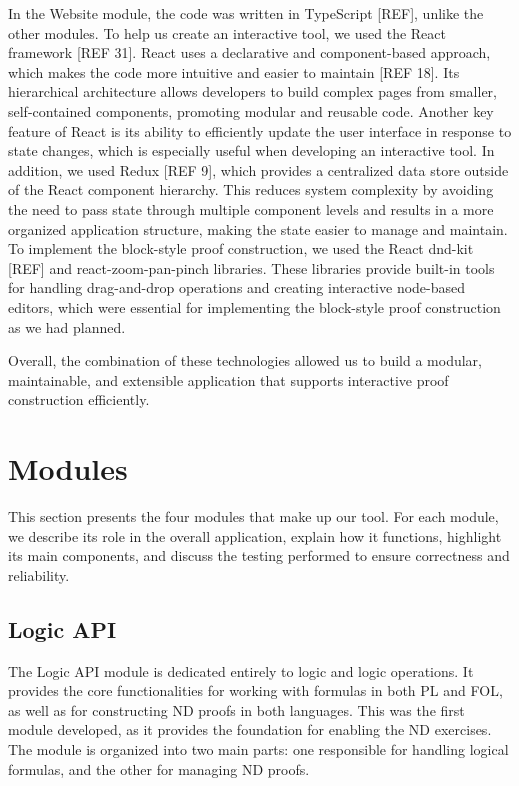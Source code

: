 In the Website module, the code was written in TypeScript [REF], unlike the other modules. To help us create an interactive tool, we used the React framework [REF 31]. React uses a declarative and component-based approach, which makes the code more intuitive and easier to maintain [REF 18]. Its hierarchical architecture allows developers to build complex pages from smaller, self-contained components, promoting modular and reusable code. Another key feature of React is its ability to efficiently update the user interface in response to state changes, which is especially useful when developing an interactive tool. In addition, we used Redux [REF 9], which provides a centralized data store outside of the React component hierarchy. This reduces system complexity by avoiding the need to pass state through multiple component levels and results in a more organized application structure, making the state easier to manage and maintain. To implement the block-style proof construction, we used the React dnd-kit [REF] and react-zoom-pan-pinch libraries. These libraries provide built-in tools for handling drag-and-drop operations and creating interactive node-based editors, which were essential for implementing the block-style proof construction as we had planned.

Overall, the combination of these technologies allowed us to build a modular, maintainable, and extensible application that supports interactive proof construction efficiently.

\section{Modules}
This section presents the four modules that make up our tool. For each module, we describe its role in the overall application, explain how it functions, highlight its main components, and discuss the testing performed to ensure correctness and reliability.

\subsection{Logic API}
The Logic API module is dedicated entirely to logic and logic operations. It provides the core functionalities for working with formulas in both \gls{PL} and \gls{FOL}, as well as for constructing \gls{ND} proofs in both languages. This was the first module developed, as it provides the foundation for enabling the \gls{ND} exercises. The module is organized into two main parts: one responsible for handling logical formulas, and the other for managing \gls{ND} proofs.

